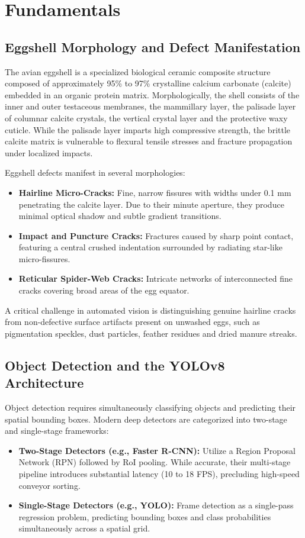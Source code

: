 \documentclass[12pt,a4paper]{report}
\begin{document}
\chapter{Fundamentals}

\section{Eggshell Morphology and Defect Manifestation}

The avian eggshell is a specialized biological ceramic composite structure composed of approximately 95\% to 97\% crystalline calcium carbonate (calcite) embedded in an organic protein matrix. Morphologically, the shell consists of the inner and outer testaceous membranes, the mammillary layer, the palisade layer of columnar calcite crystals, the vertical crystal layer and the protective waxy cuticle. While the palisade layer imparts high compressive strength, the brittle calcite matrix is vulnerable to flexural tensile stresses and fracture propagation under localized impacts.

Eggshell defects manifest in several morphologies:
\begin{itemize}
    \item \textbf{Hairline Micro-Cracks:} Fine, narrow fissures with widths under 0.1 mm penetrating the calcite layer. Due to their minute aperture, they produce minimal optical shadow and subtle gradient transitions.
    \item \textbf{Impact and Puncture Cracks:} Fractures caused by sharp point contact, featuring a central crushed indentation surrounded by radiating star-like micro-fissures.
    \item \textbf{Reticular Spider-Web Cracks:} Intricate networks of interconnected fine cracks covering broad areas of the egg equator.
\end{itemize}

A critical challenge in automated vision is distinguishing genuine hairline cracks from non-defective surface artifacts present on unwashed eggs, such as pigmentation speckles, dust particles, feather residues and dried manure streaks.

\section{Object Detection and the YOLOv8 Architecture}

Object detection requires simultaneously classifying objects and predicting their spatial bounding boxes. Modern deep detectors are categorized into two-stage and single-stage frameworks:
\begin{itemize}
    \item \textbf{Two-Stage Detectors (e.g., Faster R-CNN):} Utilize a Region Proposal Network (RPN) followed by RoI pooling. While accurate, their multi-stage pipeline introduces substantial latency (10 to 18 FPS), precluding high-speed conveyor sorting.
    \item \textbf{Single-Stage Detectors (e.g., YOLO):} Frame detection as a single-pass regression problem, predicting bounding boxes and class probabilities simultaneously across a spatial grid.
\end{itemize}
\end{document}
